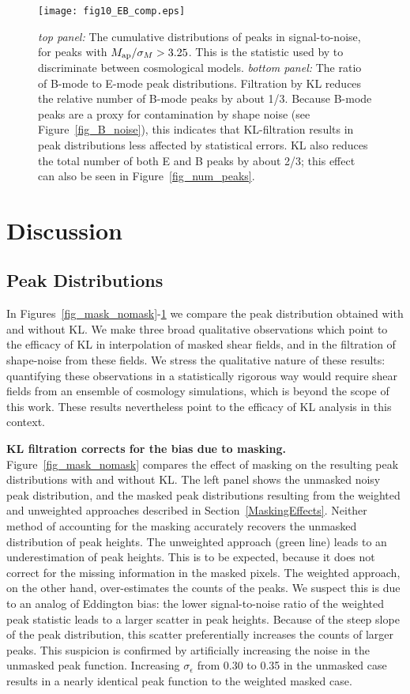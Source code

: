 \begin{figure} 
 \centering
 \texttt{[image: fig10\_EB\_comp.eps]}
 \caption{
   \textit{top panel:} The cumulative distributions of peaks in 
   signal-to-noise, for peaks with $M_{\rm ap}/\sigma_M > 3.25$.
   This is the statistic used by \citet{Dietrich10} to discriminate
   between cosmological models.  \textit{bottom panel:}  The ratio
   of B-mode to E-mode peak distributions.  Filtration by KL reduces
   the relative number of B-mode peaks by about 1/3.  Because B-mode
   peaks are a proxy for contamination by shape noise
   (see Figure~\ref{fig_B_noise}), this indicates that KL-filtration
   results in peak distributions less affected by statistical errors.
   KL also reduces the total number of both E and B peaks by about 2/3; 
   this effect can also be seen in Figure~\ref{fig_num_peaks}.
   \label{fig_EB_comp} 
 }
\end{figure}

\section{Discussion}
\label{Discussion}
\subsection{\Map Peak Distributions}
In Figures~\ref{fig_mask_nomask}-\ref{fig_EB_comp}
we compare the peak distribution obtained with and without KL.
We make three broad qualitative observations which point to the
efficacy of KL in interpolation of masked shear fields, and in
the filtration of shape-noise from these fields.  We stress the
qualitative nature of these results: quantifying 
these observations in a statistically rigorous way would require
shear fields from an ensemble of cosmology simulations, which is beyond the
scope of this work.  These results nevertheless point to the
efficacy of KL analysis in this context.

\textbf{KL filtration corrects for the bias due to masking.}
Figure~\ref{fig_mask_nomask} compares the effect of masking on the
resulting peak distributions with and without KL.  The left panel
shows the unmasked noisy peak distribution, and the masked
peak distributions resulting from the weighted and unweighted
approaches described in Section~\ref{MaskingEffects}.  
Neither method of accounting for the masking accurately 
recovers the unmasked distribution of peak heights. The unweighted
approach (green line) leads to an underestimation of peak heights.  
This is to be expected, because it does not correct for the missing 
information in the masked pixels.  The weighted approach, on the other
hand, over-estimates the counts of the peaks.  We suspect
this is due to an analog of Eddington bias: the lower signal-to-noise 
ratio of the weighted peak statistic leads to a larger scatter in peak heights.
Because of the steep slope of the peak distribution, this scatter 
preferentially increases the counts of larger peaks.  This suspicion is
confirmed by artificially increasing the noise in the unmasked peak function.
Increasing $\sigma_\epsilon$ from 0.30 to 0.35 in the unmasked case
results in a nearly identical peak function to the weighted masked case.

